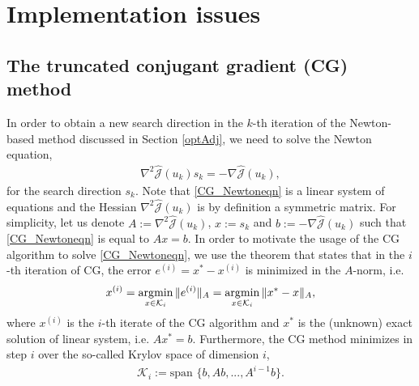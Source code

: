 \chapter{Implementation issues}
\section{The truncated conjugant gradient (CG) method}
\label{CGapp}
In order to obtain a new search direction in the $k$-th iteration of the Newton-based method discussed in Section \ref{optAdj}, we need to solve the Newton equation,
\begin{align}
 \label{CG_Newtoneqn}
 \nabla^2 \hat{\mathcal J}(u_k)s_k  = - \nabla \hat{\mathcal J}(u_k),
\end{align}
for the search direction $s_k$. Note that \eqref{CG_Newtoneqn} is a linear system of equations and the Hessian $\nabla^2 \hat{\mathcal J}(u_k)$ is by definition a symmetric matrix. For simplicity, let us denote $A := \nabla^2 \hat{\mathcal J}(u_k)$, $x := s_k$ and $b := - \nabla \hat{\mathcal J}(u_k)$ such that \eqref{CG_Newtoneqn} is equal to $A x = b$. In order to motivate the usage of the CG algorithm to solve \eqref{CG_Newtoneqn}, we use the theorem \cite[Theorem 38.2]{Tre97} that states that in the $i$-th iteration of CG, the error $e^{(i)} = x^* - x^{(i)}$ is minimized in the $A$-norm, i.e.
\begin{align*}
 x^{(i)} = \operatorname*{\arg\!\min}_{x \in \mathcal{K}_i} \|e^{(i)}\|_A = \operatorname*{\arg\!\min}_{x \in \mathcal{K}_i} \| x^* - x \|_A,
\end{align*}
where $x^{(i)}$ is the $i$-th iterate of the CG algorithm and $x^*$ is the (unknown) exact solution of linear system, i.e. $Ax^* = b$. Furthermore, the CG method minimizes in step $i$ over the so-called Krylov space of dimension $i$,
\begin{align*}
\mathcal{K}_i := \text{span }\{b, Ab, ..., A^{i-1}b \}.
\end{align*}

